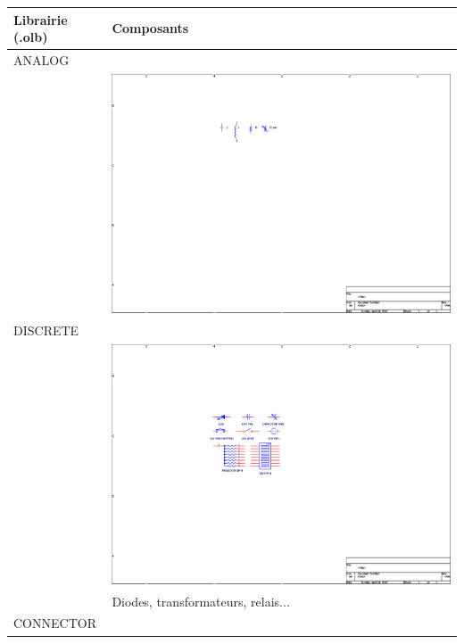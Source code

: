 \documentclass[a4paper]{article}
\begin{document}
\begin{table}[H]
	\centering
	\begin{tabular}{|l|l|}\hline
			Librairie (.olb) & Composants\\\hline\hline
			{\ttfamily ANALOG} & \\
			 & \includegraphics[scale=1.00]{Images/OrCAD_analog_olb}\\\hline
			{\ttfamily DISCRETE} & \\
			 & \includegraphics[scale=1.00]{Images/OrCAD_discrete_olb}\\
			 & Diodes, transformateurs, relais...\\\hline
			{\ttfamily CONNECTOR} & \\

\end{tabular}
\end{table}
\end{document}
